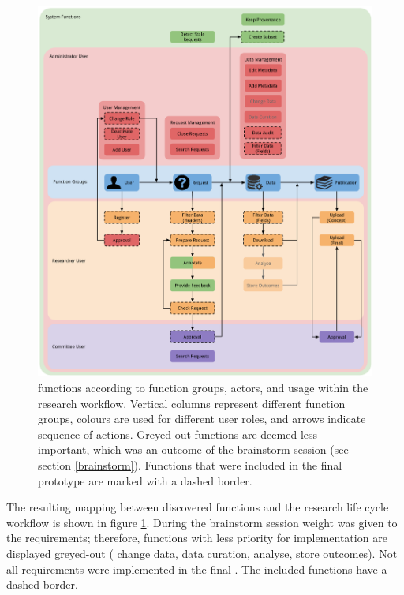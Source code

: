 \begin{figure}[!htb]
	\centering
	\includegraphics[width=0.9\linewidth]{images/functions-in-workflow}
	\caption{
		\ivfsystem{} functions according to function groups, actors, and usage within the research workflow.
		Vertical columns represent different function groups, colours are used for different user roles, and arrows indicate sequence of actions.
		Greyed-out functions are deemed less important, which was an outcome of the brainstorm session (see section \ref{brainstorm}).
		Functions that were included in the final prototype are marked with a dashed border.
	}
	\label{fig:functions-workflow}
\end{figure}

\noindent{}The resulting mapping between discovered \ivfsystem{} functions and the research life cycle workflow is shown in figure \ref{fig:functions-workflow}.
During the brainstorm session weight was given to the requirements; therefore, functions with less priority for  implementation are displayed greyed-out (\ie{} change data, data curation, analyse, store outcomes).
Not all requirements were implemented in the final \ivfprototype{}.
The included functions  have a dashed border.